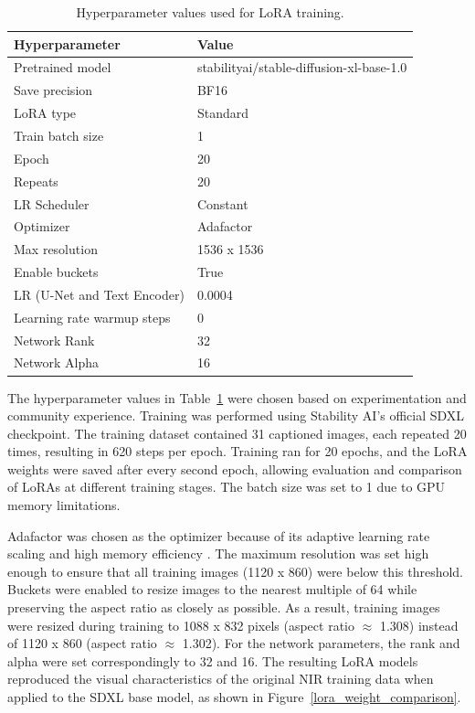 \begin{table}[h]
        \caption{Hyperparameter values used for LoRA training.}
    \label{tab:basicloraparams}
    \centering
    \begin{tabular}{|p{}|p{}|}
    \hline
    \textbf{Hyperparameter} & \textbf{Value} \\
    \hline
    Pretrained model & stabilityai/stable-diffusion-xl-base-1.0 \\
    \hline
    Save precision & BF16 \\
    \hline
    LoRA type & Standard \\
    \hline
    Train batch size & 1 \\
    \hline
    Epoch & 20 \\
    \hline
    Repeats & 20 \\
    \hline    
    LR Scheduler & Constant \\
    \hline
    Optimizer & Adafactor \\
    \hline
    Max resolution & 1536 x 1536 \\
    \hline
    Enable buckets & True \\
    \hline
    LR (U-Net and Text Encoder) & 0.0004 \\
    \hline
    Learning rate warmup steps & 0 \\
    \hline
    Network Rank & 32 \\
    \hline
    Network Alpha & 16 \\
    \hline
    \end{tabular}

\end{table}

The hyperparameter values in Table~\ref{tab:basicloraparams} were chosen based on experimentation and community experience. Training was performed using Stability AI's official SDXL checkpoint. The training dataset contained 31 captioned images, each repeated 20 times, resulting in 620 steps per epoch. Training ran for 20 epochs, and the LoRA weights were saved after every second epoch, allowing evaluation and comparison of LoRAs at different training stages. The batch size was set to 1 due to GPU memory limitations.

Adafactor was chosen as the optimizer because of its adaptive learning rate scaling and high memory efficiency \cite{shazeer2018adafactoradaptivelearningrates}. The maximum resolution was set high enough to ensure that all training images (1120 x 860) were below this threshold. Buckets were enabled to resize images to the nearest multiple of 64 while preserving the aspect ratio as closely as possible. As a result, training images were resized during training to 1088 x 832 pixels (aspect ratio $\approx$ 1.308) instead of 1120 x 860 (aspect ratio $\approx$ 1.302). For the network parameters, the rank and alpha were set correspondingly to 32 and 16. The resulting LoRA models reproduced the visual characteristics of the original NIR training data when applied to the SDXL base model, as shown in Figure~\ref{lora_weight_comparison}.


